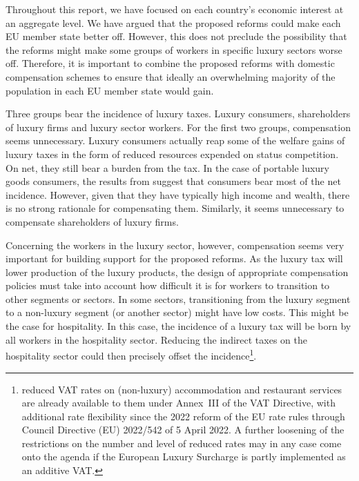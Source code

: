 \documentclass{article}
\begin{document}

Throughout this report, we have focused on each country's economic interest at an aggregate level. We have argued that the proposed reforms could make each EU member state better off. However, this does not preclude the possibility that the reforms might make some groups of workers in specific luxury sectors worse off. Therefore, it is important to combine the proposed reforms with domestic compensation schemes to ensure that ideally an overwhelming majority of the population in each EU member state would gain. 

Three groups bear the incidence of luxury taxes. Luxury consumers, shareholders of luxury firms and luxury sector workers. For the first two groups, compensation seems unnecessary. Luxury consumers actually reap some of the welfare gains of luxury taxes in the form of reduced resources expended on status competition. On net, they still bear a burden from the tax. In the case of portable luxury goods consumers, the results from \cite{Xie2026} suggest that consumers bear most of the net incidence. However, given that they have typically high income and wealth, there is no strong rationale for compensating them. Similarly, it seems unnecessary to compensate shareholders of luxury firms.

Concerning the workers in the luxury sector, however, compensation seems very important for building support for the proposed reforms. As the luxury tax will lower production of the luxury products, the design of appropriate compensation policies must take into account how difficult it is for workers to transition to other segments or sectors. In some sectors, transitioning from the luxury segment to a non-luxury segment (or another sector) might have low costs. This might be the case for hospitality. In this case, the incidence of a luxury tax will be born by all workers in the hospitality sector. Reducing the indirect taxes on the hospitality sector could then precisely offset the incidence\footnote{reduced VAT rates on (non-luxury) accommodation and restaurant services are already available to them under Annex~III of the VAT Directive, with additional rate flexibility since the 2022 reform of the EU rate rules through Council Directive (EU) 2022/542 of 5 April 2022. A further loosening of the restrictions on the number and level of reduced rates may in any case come onto the agenda if the European Luxury Surcharge is partly implemented as an additive VAT.}.
\end{document}

